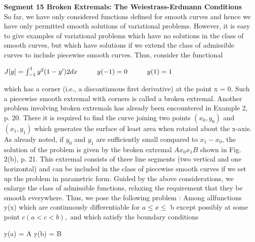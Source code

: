 \documentclass{article}
\newcommand\tab[1][1cm]{\hspace*{#1}}
\begin{document}
\textbf {Segment 15 Broken Extremals: The Weiestrass-Erdmann Conditions} \\
So far, we have only considered functions defined for smooth curves and hence we have only permitted smooth solutions of variational problems. However, it is easy to give examples of variational problems which have no solutions in the class of smooth curves, but which have solutions if we extend the class of admissible curves to include piecewise smooth curves. Thus, consider the functional
\begin{center}
$J[y] = \int_{-1}^1 y^2(1-y')2 dx \tab y(-1)=0 \tab y(1) = 1$
\end{center}
which has a corner (i.e., a discontinuous first derivative) at the point x = 0.
Such a piecewise smooth extremal with corners is called a broken extremal.
Another problem involving broken extremals has already been encountered
in Example 2, p. 20. There it is required to find the curve joining two points
$(x_0, y_0)$ and $(x_1, y_1)$ which generates the surface of least area when rotated
about the x-axis. As already noted, if $y_0$ and $y_1$ are sufficiently small
compared to $x_1 - x_0$, the solution of the problem is given by the broken
extremal $Ax_0x_1B$ shown in Fig. 2(b), p. 21. This extremal consists of three
line segments (two vertical and one horizontal) and can be included in the
class of piecewise smooth curves if we set up the problem in parametric form.
Guided by the above considerations, we enlarge the class of admissible
functions, relaxing the requirement that they be smooth everywhere. Thus,
we pose the following problem : Among allfunctions y(x) which are continuously
differentiable for $a \leq x \leq$ b except possibly at some point $c (a < c < b),$ and which satisfy the boundary conditions 
\begin{center}
y(a) = A \tab y(b) = B
\end{center}
\end{document}

